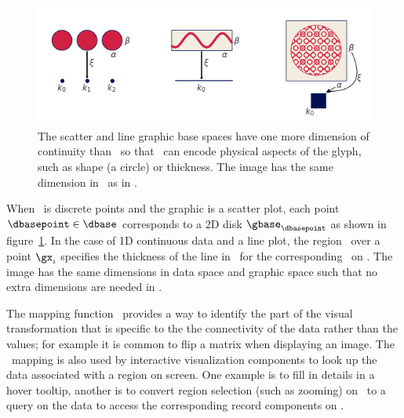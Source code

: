 \documentclass[../main.tex]{subfiles}
\begin{document}
\begin{figure}[H]
    \includegraphics[width=1\textwidth]{figures/math/retraction_maps.png}
    \caption{The scatter and line graphic base spaces have one more dimension of continuity than \dbase\ so that \gbase\ can encode physical aspects of the glyph, such as shape (a circle) or thickness. The image has the same dimension in \gbase\ as in \dbase.}
    \label{fig:graphic_retraction_map}
\end{figure}

When \dbase\ is discrete points and the graphic is a scatter plot, each point $\dbasepoint \in \dbase$ corresponds to a 2D disk $\gbase_{\dbasepoint}$ as shown in figure~\ref{fig:graphic_retraction_map}. In the case of 1D continuous data and a line plot, the region \gy\ over a point $\gx_i$ specifies the thickness of the line in \gbase\ for the corresponding \dsection\ on \dbasepoint. The image has the same dimensions in data space and graphic space such that no extra dimensions are needed in \gbase. 

The mapping function \vindex\ provides a way to identify the part of the visual transformation that is specific to the the connectivity of the data rather than the values; for example it is common to flip a matrix when displaying an image. The \vindex\ mapping is also used by interactive visualization components to look up the data associated with a region on screen.  One example is to fill in details in a hover tooltip, another is to convert region selection (such as zooming) on \gbase\ to a query on the data to access the corresponding record components on \dbase.
\end{document}
